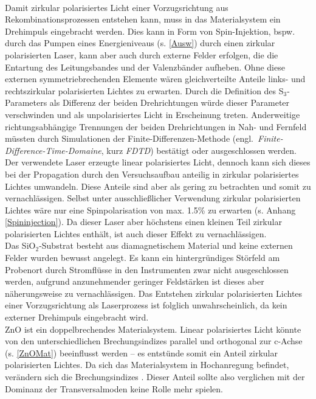 \\Damit zirkular polarisiertes Licht einer Vorzugsrichtung aus Rekombinationsprozessen entstehen kann, muss in das Materialsystem ein Drehimpuls eingebracht werden. Dies kann in Form von Spin-Injektion, bspw. durch  das Pumpen eines Energieniveaus (s. \autoref{Ausw}) durch einen zirkular polarisierten Laser, kann aber auch durch externe Felder erfolgen, die die Entartung des Leitungsbandes und der Valenzbänder aufheben. Ohne diese externen symmetriebrechenden Elemente wären gleichverteilte Anteile links- und rechtszirkular polarisierten Lichtes zu erwarten. Durch die Definition des S$_\text{3}$-Parameters als Differenz der beiden Drehrichtungen würde dieser Parameter verschwinden und als unpolarisiertes Licht in Erscheinung treten. Anderweitige richtungsabhängige Trennungen der beiden Drehrichtungen in Nah- und Fernfeld müssten durch Simulationen der Finite-Differenzen-Methode \mbox{(engl. \textit{Finite-Difference-Time-Domaine},} kurz \textit{FDTD}) bestätigt oder ausgeschlossen werden. \\
Der verwendete Laser erzeugte linear polarisiertes Licht, dennoch kann sich dieses  bei der Propagation durch den Versuchsaufbau anteilig in zirkular polarisiertes Lichtes umwandeln. Diese Anteile sind aber als gering zu betrachten und somit zu vernachlässigen. Selbst unter ausschließlicher Verwendung zirkular polarisierten Lichtes wäre nur eine Spinpolarisation von max. 1.5\% zu erwarten (s. Anhang \autoref{Spininjection}). Da dieser Laser aber höchstens einen kleinen Teil zirkular polarisierten Lichtes enthält, ist auch dieser Effekt zu vernachlässigen. 
\\
Das SiO$_\text{2}$-Substrat besteht aus diamagnetischem Material und keine externen Felder wurden bewusst angelegt. Es kann ein hintergründiges Störfeld am Probenort durch Stromflüsse in den Instrumenten zwar nicht ausgeschlossen werden, aufgrund anzunehmender geringer Feldstärken ist dieses aber näherungsweise zu vernachlässigen. Das Entstehen zirkular polarisierten Lichtes einer Vorzugsrichtung als Laserprozess ist folglich unwahrscheinlich, da kein externer Drehimpuls eingebracht wird.\\
ZnO ist ein doppelbrechendes Materialsystem. Linear polarisiertes Licht könnte von den unterschiedlichen Brechungsindizes parallel und orthogonal zur c-Achse (s. \autoref{ZnOMat}) beeinflusst werden – es entstünde somit ein Anteil zirkular polarisierten Lichtes. Da sich das Materialsystem in Hochanregung befindet, verändern sich die Brechungsindizes \cite{Wille.2016}. Dieser Anteil sollte also verglichen mit der Dominanz der Transversalmoden keine Rolle mehr spielen.\\
